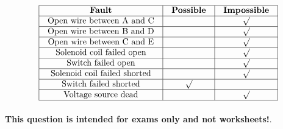 

$$\vbox{\offinterlineskip
\halign{\strut
\vrule \quad\hfil # \ \hfil & 
\vrule \quad\hfil # \ \hfil & 
\vrule \quad\hfil # \ \hfil \vrule \cr
\noalign{\hrule}
%
{\bf Fault} & {\bf Possible} & {\bf Impossible} \cr
%
\noalign{\hrule}
%
Open wire between A and C &  & $\surd$ \cr
%
\noalign{\hrule}
%
Open wire between B and D &  & $\surd$ \cr
%
\noalign{\hrule}
%
Open wire between C and E &  & $\surd$ \cr
%
\noalign{\hrule}
%
Solenoid coil failed open &  & $\surd$ \cr
%
\noalign{\hrule}
%
Switch failed open &  & $\surd$ \cr
%
\noalign{\hrule}
%
Solenoid coil failed shorted &  & $\surd$ \cr
%
\noalign{\hrule}
%
Switch failed shorted & $\surd$ &  \cr
%
\noalign{\hrule}
%
Voltage source dead &  & $\surd$ \cr
%
\noalign{\hrule}
} %
}$$ %








{\bf This question is intended for exams only and not worksheets!}.


